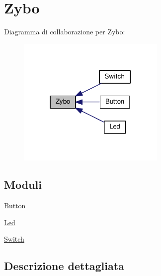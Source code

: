 \hypertarget{group___zybo}{\section{Zybo}
\label{group___zybo}
}
Diagramma di collaborazione per Zybo\+:
\nopagebreak
\begin{figure}[H]
\begin{center}
\leavevmode
\includegraphics[width=201pt]{group___zybo}
\end{center}
\end{figure}
\subsection*{Moduli}
\begin{DoxyCompactItemize}
\item 
\hyperlink{group___button}{Button}
\item 
\hyperlink{group___led}{Led}
\item 
\hyperlink{group___switch}{Switch}
\end{DoxyCompactItemize}


\subsection{Descrizione dettagliata}
